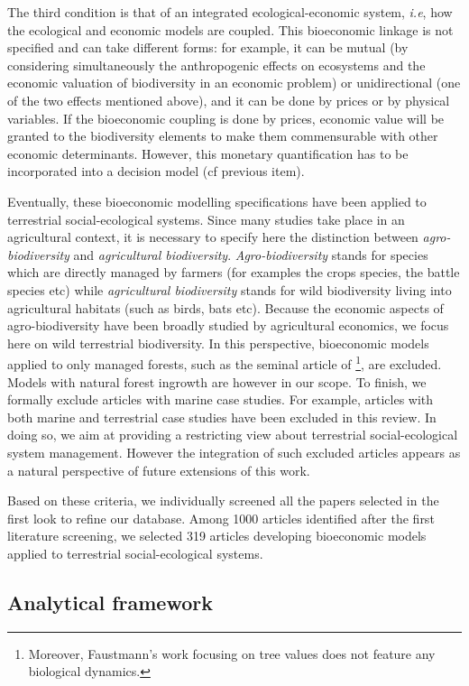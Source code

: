 The third condition is that of an integrated ecological-economic system, \textit{i.e}, how the ecological and economic models are coupled. This bioeconomic linkage is not specified and can take different forms: for example, it can be mutual (by considering simultaneously the anthropogenic effects on ecosystems and the economic valuation of biodiversity in an economic problem) or unidirectional (one of the two effects mentioned above), and it can be done by prices or by physical variables. If the bioeconomic coupling is done by prices, economic value will be granted to the biodiversity elements to make them commensurable with other economic determinants. However, this monetary quantification has to be incorporated into a decision model (cf previous item).

Eventually, these bioeconomic modelling specifications have been applied to terrestrial social-ecological systems. Since many studies take place in an agricultural context, it is necessary to specify here the distinction between \textit{agro-biodiversity} and \textit{agricultural biodiversity}.\textit{ Agro-biodiversity} stands for species which are directly managed by farmers (for examples the crops species, the battle species etc) while \textit{agricultural biodiversity }stands for wild biodiversity living into agricultural habitats (such as birds, bats etc). Because the economic aspects of agro-biodiversity  have been broadly studied by agricultural economics, we focus here on wild terrestrial biodiversity. In this perspective, bioeconomic models applied to only managed forests, such as the seminal article of \cite{Faustmann}\footnote{Moreover, Faustmann's work focusing on tree values does not feature any biological dynamics.}, are excluded. Models with natural forest ingrowth are however in our scope. To finish, we formally exclude articles with marine case studies. For example, articles with both marine and terrestrial case studies have been excluded in this review. In doing so, we aim at providing a restricting view about terrestrial social-ecological system management. However the integration of such excluded articles appears as a natural perspective of future extensions of this work.

Based on these criteria, we individually screened all the papers selected in the first look to refine our database. Among 1000 articles identified after the first literature screening, we selected 319 articles developing bioeconomic models applied to terrestrial social-ecological systems.


\subsection{Analytical framework}

